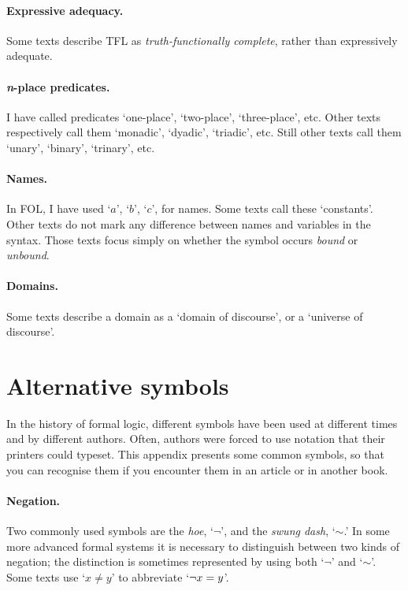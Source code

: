 \paragraph{Expressive adequacy.} Some texts describe TFL as \emph{truth-functionally complete}, rather than expressively adequate.

\paragraph{\emph{n}-place predicates.} I have called predicates `one-place', `two-place', `three-place', etc. Other texts respectively call them `monadic', `dyadic', `triadic', etc. Still other texts call them `unary', `binary', `trinary', etc.

\paragraph{Names.} In FOL, I have used `$a$', `$b$', `$c$', for names. Some texts call these `constants'. Other texts do not mark any difference between names and variables in the syntax. Those texts focus simply on  whether the symbol occurs \emph{bound} or \emph{unbound}. 

\paragraph{Domains.} Some texts describe a domain as a `domain of discourse', or a `universe of discourse'.

\section{Alternative symbols}
In the history of formal logic, different symbols have been used at different times and by different authors. Often, authors were forced to use notation that their printers could typeset. This appendix presents some common symbols, so that you can recognise them if you encounter them in an article or in another book.

\paragraph{Negation.} Two commonly used symbols are the \emph{hoe}, `$\neg$', and the \emph{swung dash}, `${\sim}$.' In some more advanced formal systems it is necessary to distinguish between two kinds of negation; the distinction is sometimes represented by using both `$\neg$' and `${\sim}$'. Some texts use `$x \neq y$' to abbreviate `$\neg x = y$'.

